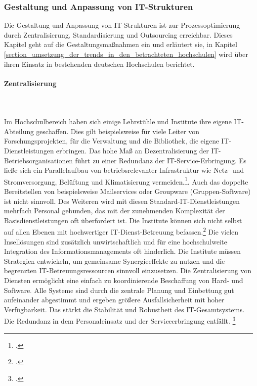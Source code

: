 \subsubsection{Gestaltung und Anpassung von IT-Strukturen}
\label{subsubsection_gestaltung_IT_strukturen}
Die Gestaltung und Anpassung von IT-Strukturen ist zur Prozessoptimierung durch Zentralisierung, 
Standardisierung und Outsourcing erreichbar. Dieses Kapitel geht auf die Gestaltungsmaßnahmen ein 
und erläutert sie, in Kapitel \ref{section_umsetzung_der_trends_in_den_betrachteten_hochschulen} 
wird über ihren Einsatz in bestehenden deutschen Hochschulen berichtet.


\paragraph{Zentralisierung}\mbox{}\\\\
\label{paragraph_zentralisierung}
Im Hochschulbereich haben sich einige Lehrstühle und Institute ihre eigene IT-Abteilung geschaffen. Dies gilt beispielsweise für viele Leiter von Forschungsprojekten, für die Verwaltung und die Bibliothek, die eigene IT-Dienstleistungen erbringen. Das hohe Maß an Dezentralisierung der IT-Betriebsorganisationen führt zu einer Redundanz der IT-Service-Erbringung. Es ließe sich ein Parallelaufbau von betriebsrelevanter Infrastruktur wie Netz- und Stromversorgung, Belüftung und Klimatisierung vermeiden.\footcite[Vgl.][22]{stratmann_it_2013}. 
Auch das doppelte Bereitstellen von beispielsweise Mailservices oder Groupware (Gruppen-Software) ist nicht sinnvoll. Des Weiteren wird mit diesen Standard-IT-Dienstleistungen mehrfach Personal gebunden, das mit der zunehmenden Komplexität der Basisdienstleistungen oft überfordert ist.
Die Institute können sich nicht selbst auf allen Ebenen mit hochwertiger IT-Dienst-Betreuung befassen.\footcite[Vgl.][21]{broecker_2011} Die vielen Insellösungen sind zusätzlich unwirtschaftlich und für eine hochschulweite Integration des Informationsmanagements oft hinderlich. Die Institute müssen Strategien entwickeln, um gemeinsame Synergieeffekte zu nutzen und die begrenzten IT-Betreuungsressourcen sinnvoll einzusetzen.
Die Zentralisierung von Diensten ermöglicht eine einfach zu koordinierende Beschaffung von Hard- und Software. Alle Systeme sind durch die zentrale Planung und Einbettung gut aufeinander abgestimmt und ergeben größere Ausfallsicherheit mit hoher Verfügbarkeit. Das stärkt die Stabilität und Robustheit des IT-Gesamtsystems. Die Redundanz in dem Personaleinsatz und der Serviceerbringung entfällt. \footcite[Vgl.][22]{moenkediek_2006}


